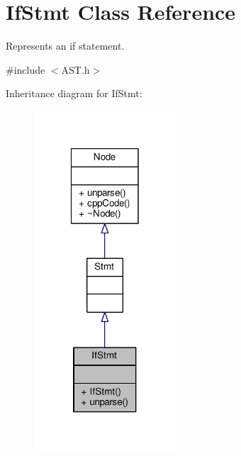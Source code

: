 \hypertarget{classIfStmt}{\section{If\-Stmt Class Reference}
\label{classIfStmt}
}


Represents an if statement. \par
  




{\ttfamily \#include $<$A\-S\-T.\-h$>$}



Inheritance diagram for If\-Stmt\-:\nopagebreak
\begin{figure}[H]
\begin{center}
\leavevmode
\includegraphics[width=150pt]{classIfStmt__inherit__graph}
\end{center}
\end{figure}


